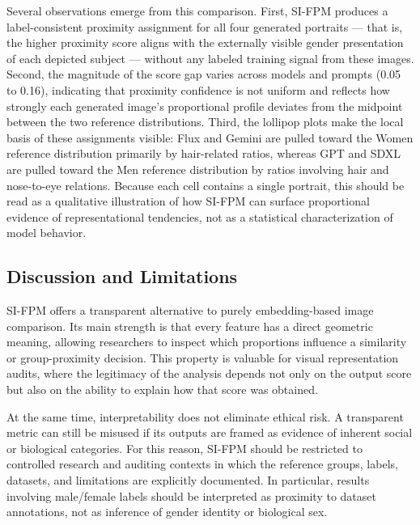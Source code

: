 \documentclass{article}
\begin{document}
Several observations emerge from this comparison. First, SI-FPM produces a label-consistent proximity assignment for all four generated portraits — that is, the higher proximity score aligns with the externally visible gender presentation of each depicted subject — without any labeled training signal from these images. Second, the magnitude of the score gap varies across models and prompts (0.05 to 0.16), indicating that proximity confidence is not uniform and reflects how strongly each generated image's proportional profile deviates from the midpoint between the two reference distributions. Third, the lollipop plots make the local basis of these assignments visible: Flux and Gemini are pulled toward the Women reference distribution primarily by hair-related ratios, whereas GPT and SDXL are pulled toward the Men reference distribution by ratios involving hair and nose-to-eye relations. Because each cell contains a single portrait, this should be read as a qualitative illustration of how SI-FPM can surface proportional evidence of representational tendencies, not as a statistical characterization of model behavior.


\subsection{Discussion and Limitations}
\label{discussion}


SI-FPM offers a transparent alternative to purely embedding-based image comparison. Its main strength is that every feature has a direct geometric meaning, allowing researchers to inspect which proportions influence a similarity or group-proximity decision. This property is valuable for visual representation audits, where the legitimacy of the analysis depends not only on the output score but also on the ability to explain how that score was obtained.

At the same time, interpretability does not eliminate ethical risk. A transparent metric can still be misused if its outputs are framed as evidence of inherent social or biological categories. For this reason, SI-FPM should be restricted to controlled research and auditing contexts in which the reference groups, labels, datasets, and limitations are explicitly documented. In particular, results involving male/female labels should be interpreted as proximity to dataset annotations, not as inference of gender identity or biological sex.
\end{document}
